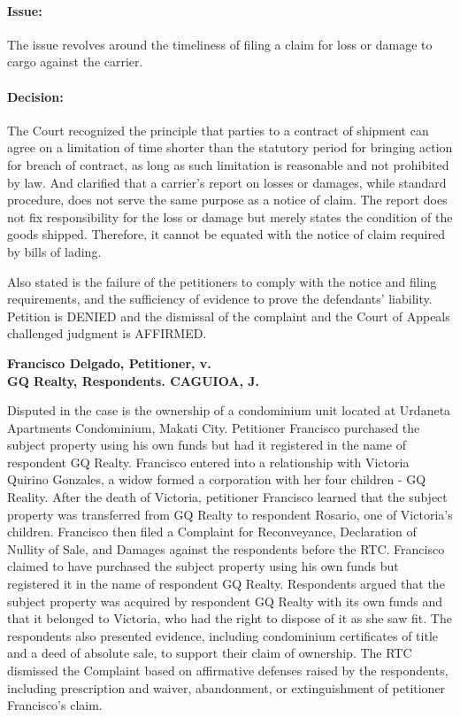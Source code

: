 \documentclass[
12pt,
oneside,
onehalfspacing,
headsepline
]{DigestCollection}
\begin{document}
\paragraph{Issue:}


The issue revolves around the timeliness of filing a claim for loss or damage to cargo against the carrier.

\paragraph{Decision:}

The Court recognized the principle that parties to a contract of shipment can agree on a limitation of time shorter than the statutory period for bringing action for breach of contract, as long as such limitation is reasonable and not prohibited by law. And clarified that a carrier's report on losses or damages, while standard procedure, does not serve the same purpose as a notice of claim. The report does not fix responsibility for the loss or damage but merely states the condition of the goods shipped. Therefore, it cannot be equated with the notice of claim required by bills of lading.

Also stated is the failure of the petitioners to comply with the notice and filing requirements, and the sufficiency of evidence to prove the defendants' liability. Petition is DENIED and the dismissal of the complaint and the Court of Appeals challenged judgment is AFFIRMED.



\noindent\textbf{Francisco Delgado, Petitioner, v. \\GQ Realty, Respondents. CAGUIOA, J.}\vspace{0.4cm}

Disputed in the case is the ownership of a condominium unit located at Urdaneta Apartments Condominium, Makati City. Petitioner Francisco purchased the subject property using his own funds but had it registered in the name of respondent GQ Realty. Francisco entered into a relationship with Victoria Quirino Gonzales, a widow formed a corporation with her four children - GQ Reality. After the death of Victoria, petitioner Francisco learned that the subject property was transferred from GQ Realty to respondent Rosario, one of Victoria's children. Francisco then filed a Complaint for Reconveyance, Declaration of Nullity of Sale, and Damages against the respondents before the RTC. Francisco claimed to have purchased the subject property using his own funds but registered it in the name of respondent GQ Realty. Respondents argued that the subject property was acquired by respondent GQ Realty with its own funds and that it belonged to Victoria, who had the right to dispose of it as she saw fit. The respondents also presented evidence, including condominium certificates of title and a deed of absolute sale, to support their claim of ownership. The RTC dismissed the Complaint based on affirmative defenses raised by the respondents, including prescription and waiver, abandonment, or extinguishment of petitioner Francisco's claim.
\end{document}
